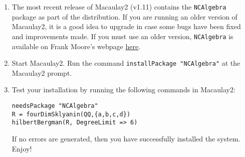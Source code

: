 \documentclass[10pt]{article}
\begin{document}
\begin{enumerate}
\item The most recent release of Macaulay2 (v1.11) contains the \texttt{NCAlgebra} package as part of the distribution.
If you are running an older version of Macaulay2, it is a good idea to upgrade in case some bugs have
been fixed and improvements made.  If you must use an older version, \texttt{NCAlgebra} is available on Frank Moore's webpage
\href{http://users.wfu.edu/moorewf}{here}.

\item Start Macaulay2.  Run the command \texttt{installPackage "NCAlgebra"} at the Macaulay2 prompt.

\item Test your installation by running the following commands in Macaulay2:

\begin{verbatim}
needsPackage "NCAlgebra"
R = fourDimSklyanin(QQ,{a,b,c,d})
hilbertBergman(R, DegreeLimit => 6)
\end{verbatim}

If no errors are generated, then you have successfully installed the system.  Enjoy!

\end{enumerate}
\end{document}
